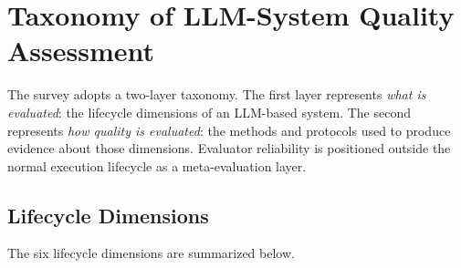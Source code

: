 \section{Taxonomy of LLM-System Quality Assessment}
\label{sec:taxonomy}

The survey adopts a two-layer taxonomy. The first layer represents \emph{what is evaluated}: the lifecycle dimensions of an LLM-based system. The second represents \emph{how quality is evaluated}: the methods and protocols used to produce evidence about those dimensions. Evaluator reliability is positioned outside the normal execution lifecycle as a meta-evaluation layer.

\subsection{Lifecycle Dimensions}

The six lifecycle dimensions are summarized below.

